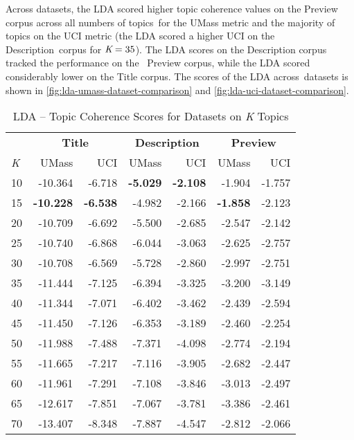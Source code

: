 \documentclass[letterpaper,12pt]{article}
\begin{document}
Across datasets, the LDA scored higher topic coherence values on the Preview corpus across all numbers of topics\
for the UMass metric and the majority of topics on the UCI metric (the LDA scored a higher UCI on the Description\
corpus for $\emph{K} = 35$). The LDA scores on the Description corpus tracked the performance on the \
Preview corpus, while the LDA scored considerably lower on the Title corpus. The scores of the LDA across\
datasets is shown in \ref{fig:lda-umass-dataset-comparison} and \ref{fig:lda-uci-dataset-comparison}.
\begin{table}
	\caption{\label{tab:lda_data_comp} LDA -- Topic Coherence Scores for Datasets on \emph{K} Topics}
	\begin{center}
		\begin{tabular}{| l | rr | rr | rr |}
			\hline
			{} & \multicolumn{2}{c|}{\textbf{Title}} & \multicolumn{2}{c|}{\textbf{Description}} & \multicolumn{2}{c|}{\textbf{Preview}} \\
			\emph{K} &       UMass &    UCI &  UMass &    UCI &   UMass &    UCI \\
			\hline
				10  & -10.364 & -6.718 &      \textbf{-5.029} & \textbf{-2.108} &  -1.904 & -1.757 \\
				15  & \textbf{-10.228} & \textbf{-6.538} &      -4.982 & -2.166 &  \textbf{-1.858} & -2.123 \\
				20  & -10.709 & -6.692 &      -5.500 & -2.685 &  -2.547 & -2.142 \\
				25  & -10.740 & -6.868 &      -6.044 & -3.063 &  -2.625 & -2.757 \\
				30  & -10.708 & -6.569 &      -5.728 & -2.860 &  -2.997 & -2.751 \\
				35  & -11.444 & -7.125 &      -6.394 & -3.325 &  -3.200 & -3.149 \\
				40  & -11.344 & -7.071 &      -6.402 & -3.462 &  -2.439 & -2.594 \\
				45  & -11.450 & -7.126 &      -6.353 & -3.189 &  -2.460 & -2.254 \\
				50  & -11.988 & -7.488 &      -7.371 & -4.098 &  -2.774 & -2.194 \\
				55  & -11.665 & -7.217 &      -7.116 & -3.905 &  -2.682 & -2.447 \\
				60  & -11.961 & -7.291 &      -7.108 & -3.846 &  -3.013 & -2.497 \\
				65  & -12.617 & -7.851 &      -7.067 & -3.781 &  -3.386 & -2.461 \\
				70  & -13.407 & -8.348 &      -7.887 & -4.547 &  -2.812 & -2.066 \\

\end{tabular}
\end{center}
\end{table}
\end{document}
